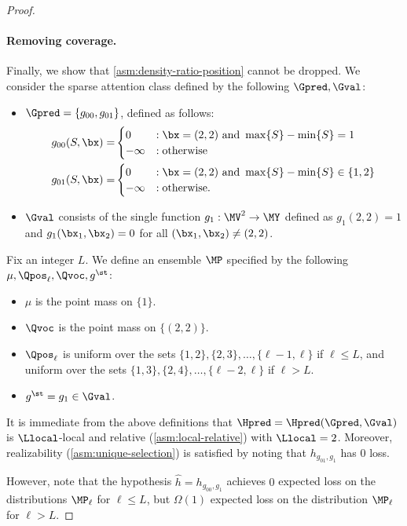 \documentclass{article}
\begin{document}
\begin{proof}
    \paragraph{Removing coverage.} Finally, we show that \cref{asm:density-ratio-position} cannot be dropped. We consider the sparse attention class defined by the following $\Gpred, \Gval$: 
      \begin{itemize}
\item $\Gpred= \{ g_{00}, g_{01} \}$, defined as follows:
  \begin{align}
    g_{00}(S, \bx) =& \begin{cases}
      0 &: \bx = (2,2) \mbox{ and } \max\{ S \} - \min\{S \} = 1 \\
      -\infty &: \mbox{otherwise}
    \end{cases}\nonumber\\
    g_{01}(S, \bx) =& \begin{cases}
      0& : \bx = (2,2) \mbox{ and }\max\{S \} - \min\{S \} \in \{1,2\}\\
      -\infty &: \mbox{otherwise}.
      \end{cases}\nonumber
  \end{align}
\item $\Gval$ consists of the single function $g_1 : \MV^2 \to \MY$ defined as $g_1(2,2) = 1$ and $g_1(\bx_1, \bx_2) = 0$ for all $(\bx_1, \bx_2) \neq (2,2)$.
\end{itemize}
Fix an integer $L$. We define an ensemble $\MP$ specified by the following $\mu, \Qpos_\ell, \Qvoc, g^\st$:
\begin{itemize}
  \item $\mu$ is the point mass on $\{1 \}$. 
  \item $\Qvoc$ is the point mass on $\{ (2,2) \}$. 
  \item $\Qpos_\ell$ is uniform over the sets $\{1, 2\}, \{2,3\}, \ldots, \{\ell-1, \ell \}$ if $\ell \leq L$, and uniform over the sets $\{ 1,3\}, \{2,4\}, \ldots, \{\ell-2, \ell \}$ if $\ell > L$. 
  \item $g^\st = g_1 \in \Gval$. 
  \end{itemize}
  It is immediate from the above definitions that $\Hpred = \Hpred(\Gpred, \Gval)$ is $\Llocal$-local and relative (\cref{asm:local-relative}) with $\Llocal = 2$. Moreover, realizability (\cref{asm:unique-selection}) is satisfied by noting that $h_{g_{01}, g_1}$ has $0$ loss.

  However, note that the hypothesis $\hat h = h_{g_{00}, g_1}$ achieves $0$ expected loss on the distributions $\MP_\ell$ for $\ell \leq L$, but $\Omega(1)$ expected loss on the distribution $\MP_\ell$ for $\ell > L$. 
\end{proof}
\end{document}
